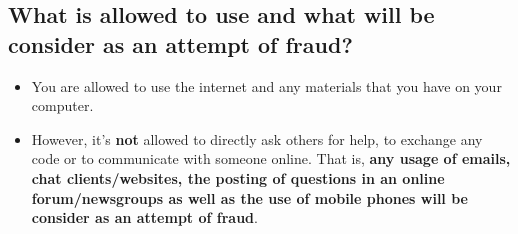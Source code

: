 \documentclass[
]{scrartcl}
\providecommand{\tightlist}{%
  \setlength{\itemsep}{0pt}\setlength{\parskip}{0pt}}
\begin{document}
\hypertarget{what-is-allowed-to-use-and-what-will-be-consider-as-an-attempt-of-fraud}{%
\subsection*{What is allowed to use and what will be consider as an attempt of fraud?}\label{what-is-allowed-to-use-and-what-will-be-consider-as-an-attempt-of-fraud}}

\begin{itemize}
\tightlist
\item
  You are allowed to use the internet and any materials that you have on your computer.
\item
  However, it's \textbf{not} allowed to directly ask others for help, to exchange any code or to communicate with someone online. That is, \textbf{any usage of emails, chat clients/websites, the posting of questions in an online forum/newsgroups as well as the use of mobile phones will be consider as an attempt of fraud}.
\end{itemize}
\end{document}
